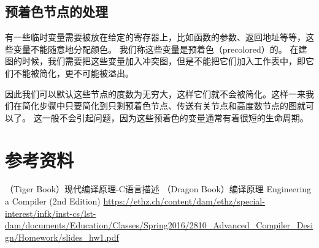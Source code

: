 \subsection{预着色节点的处理}
有一些临时变量需要被放在给定的寄存器上，比如函数的参数、返回地址等等，这些变量不能随意地分配颜色。
我们称这些变量是预着色（precolored）的。
在建图的时候，我们需要把这些变量加入冲突图，但是不能把它们加入工作表中，即它们不能被简化，更不可能被溢出。

因此我们可以默认这些节点的度数为无穷大，这样它们就不会被简化。这样一来我们在简化步骤中只要简化到只剩预着色节点、传送有关节点和高度数节点的图就可以了。
这一般不会引起问题，因为这些预着色的变量通常有着很短的生命周期。

\section{参考资料}
（Tiger Book）现代编译原理-C语言描述
（Dragon Book）编译原理
Engineering a Compiler (2nd Edition)
\url{https://ethz.ch/content/dam/ethz/special-interest/infk/inst-cs/lst-dam/documents/Education/Classes/Spring2016/2810_Advanced_Compiler_Design/Homework/slides_hw1.pdf}
